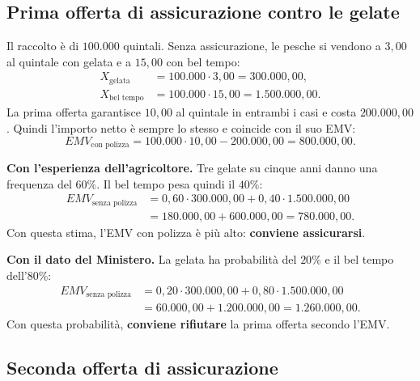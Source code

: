 \subsection*{Prima offerta di assicurazione contro le gelate}

\noindent Il raccolto è di $100.000$ quintali. Senza assicurazione,
le pesche si vendono a $3{,}00$ al quintale con gelata e a $15{,}00$
con bel tempo:
\begin{align*}
    X_{\text{gelata}} &= 100.000 \cdot 3{,}00 = 300.000{,}00, \\
    X_{\text{bel tempo}} &= 100.000 \cdot 15{,}00 = 1.500.000{,}00.
\end{align*}
\noindent La prima offerta garantisce $10{,}00$ al quintale in
entrambi i casi e costa $200.000{,}00$. Quindi l'importo netto
è sempre lo stesso e coincide con il suo EMV:
\[
    EMV_{\text{con polizza}}
        = 100.000 \cdot 10{,}00 - 200.000{,}00 = 800.000{,}00.
\]

\noindent \textbf{Con l'esperienza dell'agricoltore.}
Tre gelate su cinque anni danno una frequenza del $60\%$.
Il bel tempo pesa quindi il $40\%$:
\begin{align*}
    EMV_{\text{senza polizza}}
        &= 0{,}60 \cdot 300.000{,}00 + 0{,}40 \cdot 1.500.000{,}00 \\
        &= 180.000{,}00 + 600.000{,}00 = 780.000{,}00.
\end{align*}
\noindent Con questa stima, l'EMV con polizza è più alto:
\textbf{conviene assicurarsi}.

\noindent \textbf{Con il dato del Ministero.}
La gelata ha probabilità del $20\%$ e il bel tempo dell'$80\%$:
\begin{align*}
    EMV_{\text{senza polizza}}
        &= 0{,}20 \cdot 300.000{,}00 + 0{,}80 \cdot 1.500.000{,}00 \\
        &= 60.000{,}00 + 1.200.000{,}00 = 1.260.000{,}00.
\end{align*}
\noindent Con questa probabilità, \textbf{conviene rifiutare}
la prima offerta secondo l'EMV.

\subsection*{Seconda offerta di assicurazione}

